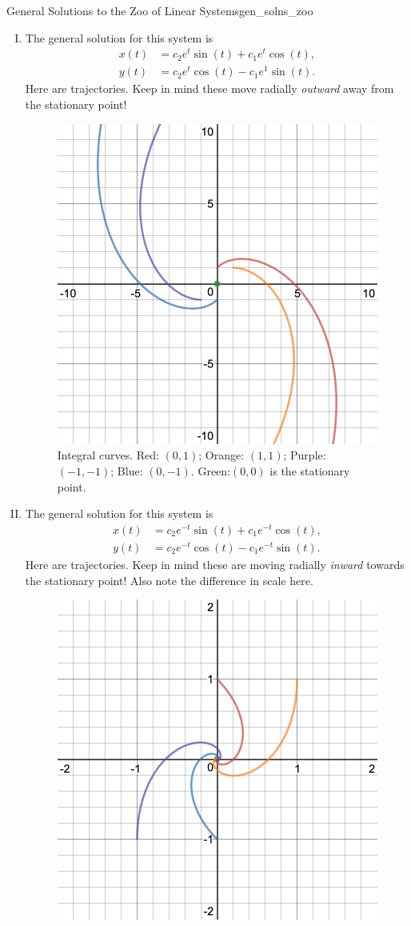 \begin{ex}{General Solutions to the Zoo of Linear Systems}{gen_solns_zoo}
\begin{enumerate}[(I)]
\begin{figure}[H]
            \end{figure}
            \item The general solution for this system is
            \begin{align*}
                x(t)&= c_2 e^t \sin(t)+c_1e^t\cos(t),\\
                y(t)&= c_2 e^t \cos(t) - c_1e^1 \sin(t).
            \end{align*}
            Here are trajectories. Keep in mind these move radially \emph{outward} away from the stationary point!
                        \begin{figure}[H]
                \centering
                \includegraphics[width=.6\textwidth]{Figures_Part_7/x+y-x+yintegralcurves.png}
                \caption{Integral curves. Red: $(0,1)$; Orange: $(1,1)$; Purple: $(-1,-1)$; Blue: $(0,-1)$. Green:$(0,0)$ is the stationary point.}
            \end{figure}
            \item The general solution for this system is
            \begin{align*}
                x(t)&=c_2 e^{-t}\sin(t)+c_1 e^{-t}\cos(t),\\
                y(t)&=c_2e^{-t}\cos(t)-c_1e^{-t}\sin(t).
            \end{align*}
            Here are trajectories. Keep in mind these are moving radially \emph{inward} towards the stationary point! Also note the difference in scale here.
            \begin{figure}[H]
                \centering
                \includegraphics[width=.6\textwidth]{Figures_Part_7/-x+y-x-yintegralcurves.png}

\end{figure}
\end{enumerate}
\end{ex}
